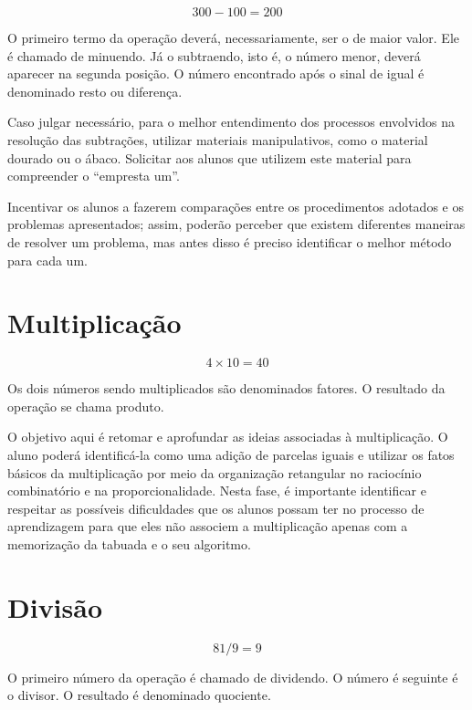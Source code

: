 
$$300 - 100 = 200$$

O primeiro termo da operação deverá, necessariamente, ser o de maior
valor. Ele é chamado de minuendo. Já o subtraendo, isto é, o número
menor, deverá aparecer na segunda posição. O número encontrado após o
sinal de igual é denominado resto ou diferença.

Caso julgar necessário, para o melhor entendimento dos processos
envolvidos na resolução das subtrações, utilizar materiais
manipulativos, como o material dourado ou o ábaco. Solicitar aos alunos
que utilizem este material para compreender o ``empresta um''.

Incentivar os alunos a fazerem comparações entre os procedimentos
adotados e os problemas apresentados; assim, poderão perceber que
existem diferentes maneiras de resolver um problema, mas antes disso é
preciso identificar o melhor método para cada um.

\section{Multiplicação}


$$4\times 10 = 40$$

Os dois números sendo multiplicados são denominados fatores. O resultado
da operação se chama produto.

O objetivo aqui é retomar e aprofundar as ideias associadas à
multiplicação. O aluno poderá identificá-la como uma adição de parcelas
iguais e utilizar os fatos básicos da multiplicação por meio da
organização retangular no raciocínio combinatório e na
proporcionalidade. Nesta fase, é importante identificar e respeitar as
possíveis dificuldades que os alunos possam ter no processo de
aprendizagem para que eles não associem a multiplicação apenas com a
memorização da tabuada e o seu algoritmo.

\section{Divisão}


$$81 / 9 = 9$$

O primeiro número da operação é chamado de dividendo. O número é
seguinte é o divisor. O resultado é denominado quociente.

